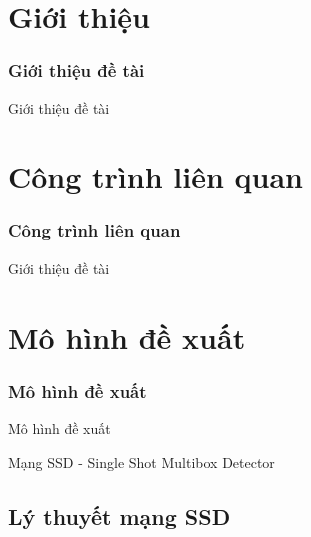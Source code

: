 \documentclass{beamer}
\begin{document}



\section{Giới thiệu}

\begin{frame}
\frametitle{Giới thiệu đề tài}
{\Huge Giới thiệu đề tài}
\end{frame}


\section{Công trình liên quan}
\begin{frame}
\frametitle{Công trình liên quan}
{\Huge Giới thiệu đề tài}
\end{frame}



\section{Mô hình đề xuất}
\begin{frame}
\frametitle{Mô hình đề xuất}
{\Huge Mô hình đề xuất}
\hspace{10 cm}




Mạng SSD - Single Shot Multibox Detector
\end{frame}

\subsection{Lý thuyết mạng SSD}

\frame{\tableofcontents[currentsection]}
\end{document}
